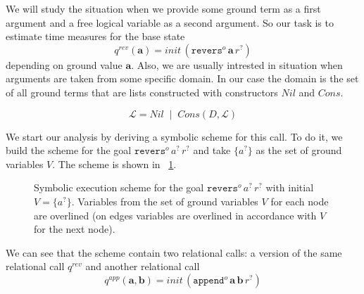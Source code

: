 We will study the situation when we provide some ground term as a first argument and a free logical variable as a second argument. So our task is to estimate time measures for the base state \[ q^{rev}(\mathbf{a}) = init\,(\texttt{revers$^o$} \, \mathbf{a} \, r^?) \] depending on ground value $\mathbf{a}$. Also, we are usually intrested in situation when arguments are taken from some specific domain. In our case the domain is the set of all ground terms that are lists constructed with constructors $Nil$ and $Cons$.

\[ \mathcal{L} = Nil \; \mid \; Cons(D, \mathcal{L}) \]

We start our analysis by deriving a symbolic scheme for this call. To do it, we build the scheme for the goal $\texttt{revers$^o$} \, a^? \, r^?$ and take $\{ a^? \}$ as the set of ground variables $V$. The scheme is shown in \figureword~\ref{fig:reverso_scheme}.

\begin{figure}[t]
\begin{center}
\end{center}

\caption{Symbolic execution scheme for the goal $\texttt{revers$^o$} \, a^? \, r^?$ with initial $V = \{ a^? \}$. Variables from the set of ground variables $V$ for each node are overlined (on edges variables are overlined in accordance with $V$ for the next node). }
\label{fig:reverso_scheme}
\end{figure}


We can see that the scheme contain two relational calls: a version of the same relational call $q^{rev}$ and another relational call \[ q^{app}(\mathbf{a}, \mathbf{b}) = init\,( \texttt{append$^o$} \, \mathbf{a} \, \mathbf{b} \, r^? ) \]


